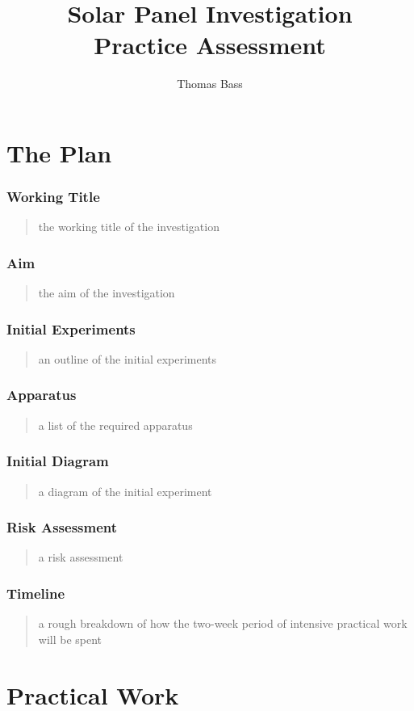 \documentclass{article}
\title{Solar Panel Investigation \\ Practice Assessment}
\author{Thomas Bass}
\begin{document}
\maketitle


\part{The Plan}
\section{Working Title}
\begin{quote}
the working title of the investigation
\end{quote}
\section{Aim}
\begin{quote}
the aim of the investigation
\end{quote}
\section{Initial Experiments}
\begin{quote}
an outline of the initial experiments
\end{quote}
\section{Apparatus}
\begin{quote}
a list of the required apparatus
\end{quote}
\section{Initial Diagram}
\begin{quote}
a diagram of the initial experiment
\end{quote}
\section{Risk Assessment}
\begin{quote}
a risk assessment
\end{quote}
\section{Timeline}
\begin{quote}
a rough breakdown of how the two-week period of intensive practical work will be spent
\end{quote}
\part{Practical Work}
\end{document}
